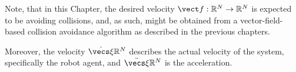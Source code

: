 
% 



Note, that in this Chapter, the desired velocity $\vect f: \mathbb{R}^N \rightarrow \mathbb{R}^N$ is expected to be avoiding collisions, and, as such, might be obtained from a vector-field-based collision avoidance algorithm as described in the previous chapters. 

Moreover, the velocity $\dot{\vecs \xi} \mathbb{R}^N$ describes the actual velocity of the system, specifically the robot agent, and $\ddot{\vecs \xi} \mathbb{R}^N $ is the acceleration.



% 





